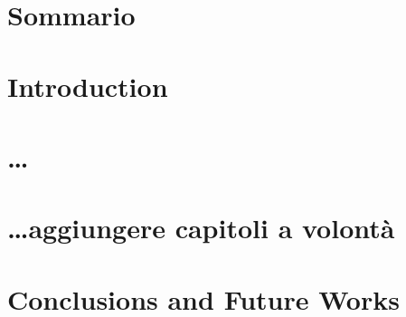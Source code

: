 \documentclass[12pt,a4paper,twoside,openright]{report}
\makeatletter
\def\cleardoublepage{\clearpage\if@twoside \ifodd\c@page\else
\hbox{}
\vspace*{\fill}
\begin{center}
\end{center}
\vspace{\fill}
\thispagestyle{empty}
\newpage
\if@twocolumn\hbox{}\newpage\fi\fi\fi}
\makeatother
\begin{document}
\setcounter{page}{1}
\pagestyle{empty}



\pagestyle{fancy}
\renewcommand{\contentsname}{Table of Contents}%

\chapter*{Sommario}


\tableofcontents
\cleardoublepage


\setcounter{page}{1}

\chapter{Introduction}
\label{chap:one}


\chapter{\dots}
\label{chap:two}


\chapter*{\dots aggiungere capitoli a volont\`a}



\chapter{Conclusions and Future Works}
\label{chap:conclusions}

\end{document}
